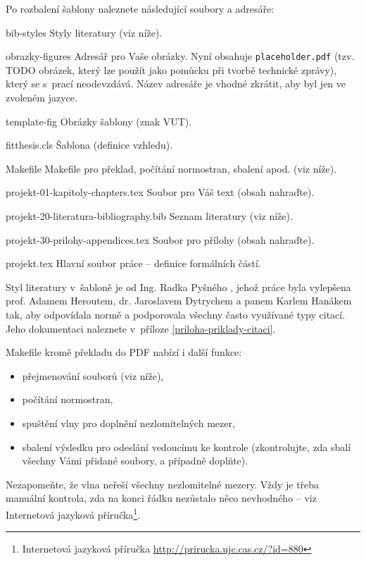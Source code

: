 Po rozbalení šablony naleznete následující soubory a adresáře:
\begin{DESCRIPTION}
  \item [bib-styles] Styly literatury (viz níže). 
  \item [obrazky-figures] Adresář pro Vaše obrázky. Nyní obsahuje \texttt{placeholder.pdf} (tzv. TODO obrázek, který lze použít jako pomůcku při tvorbě technické zprávy), který se s~prací neodevzdává. Název adresáře je vhodné zkrátit, aby byl jen ve zvoleném jazyce.
  \item [template-fig] Obrázky šablony (znak VUT).
  \item [fitthesis.cls] Šablona (definice vzhledu).
  \item [Makefile] Makefile pro překlad, počítání normostran, sbalení apod. (viz níže).
  \item [projekt-01-kapitoly-chapters.tex] Soubor pro Váš text (obsah nahraďte).
  \item [projekt-20-literatura-bibliography.bib] Seznam literatury (viz níže).
  \item [projekt-30-prilohy-appendices.tex] Soubor pro přílohy (obsah nahraďte).
  \item [projekt.tex] Hlavní soubor práce -- definice formálních částí.
\end{DESCRIPTION}

Styl literatury v~šabloně je od Ing. Radka Pyšného \cite{Pysny}, jehož práce byla vylepšena prof. Adamem Heroutem, dr. Jaroslavem Dytrychem a panem Karlem Hanákem tak, aby odpovídala normě a podporovala všechny často využívané typy citací. Jeho dokumentaci naleznete v~příloze \ref{priloha-priklady-citaci}.

\begin{samepage}
Makefile kromě překladu do PDF nabízí i další funkce:
\begin{itemize}
  \item přejmenování souborů (viz níže),
  \item počítání normostran,
  \item spuštění vlny pro doplnění nezlomitelných mezer,
  \item sbalení výsledku pro odeslání vedoucímu ke kontrole (zkontrolujte, zda sbalí všechny Vámi přidané soubory, a případně doplňte).
\end{itemize}
\end{samepage}

Nezapomeňte, že vlna neřeší všechny nezlomitelné mezery. Vždy je třeba manuální kontrola, zda na konci řádku nezůstalo něco nevhodného -- viz Internetová jazyková příručka\footnote{Internetová jazyková příručka \url{http://prirucka.ujc.cas.cz/?id=880}}.

